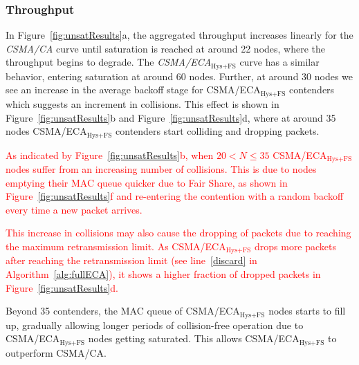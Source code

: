 	\subsubsection{Throughput}
	
	
	In Figure~\ref{fig:unsatResults}a, the aggregated throughput increases linearly for the \emph{CSMA/CA} curve until saturation is reached at around 22 nodes, where the throughput begins to degrade. The \emph{CSMA/ECA$_{\text{Hys+FS}}$} curve has a similar behavior, entering saturation at around 60 nodes. Further, at around 30 nodes we see an increase in the average backoff stage for CSMA/ECA$_{\text{Hys+FS}}$ contenders which suggests an increment in collisions. This effect is shown in Figure~\ref{fig:unsatResults}b and Figure~\ref{fig:unsatResults}d, where at around 35 nodes CSMA/ECA$_{\text{Hys+FS}}$ contenders start colliding and dropping packets. 
	
	\textcolor{red}{As indicated by Figure~\ref{fig:unsatResults}b, when $20<N\leq 35$ CSMA/ECA$_{\text{Hys+FS}}$ nodes suffer from an increasing number of  collisions. This is due to nodes emptying their MAC queue quicker due to Fair Share, as shown in Figure~\ref{fig:unsatResults}f and re-entering the contention with a random backoff every time a new packet arrives.} 
	
	\textcolor{red}{This increase in collisions may also cause the dropping of packets due to reaching the maximum retransmission limit. As CSMA/ECA$_{\text{Hys+FS}}$ drops more packets after reaching the retransmission limit (see line~\ref{discard} in Algorithm~\ref{alg:fullECA}), it shows a higher fraction of dropped packets in Figure~\ref{fig:unsatResults}d.}
	
	Beyond 35 contenders, the MAC queue of CSMA/ECA$_{\text{Hys+FS}}$ nodes starts to fill up, gradually allowing longer periods of collision-free operation due to CSMA/ECA$_{\text{Hys+FS}}$ nodes getting saturated. This allows CSMA/ECA$_{\text{Hys+FS}}$ to outperform CSMA/CA.\\
		
